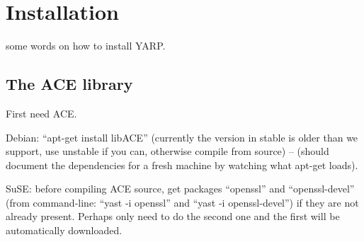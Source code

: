
\section{Installation}

some words on how to install YARP.

\subsection{The ACE library}

First need ACE.

Debian: ``apt-get install libACE'' (currently the version in stable is
older than we support, use unstable if you can, otherwise compile from
source) -- (should document the dependencies for a fresh machine by watching
what apt-get loads).


SuSE: before compiling ACE source, get packages ``openssl'' and
``openssl-devel'' (from command-line: ``yast -i openssl'' and ``yast
-i openssl-devel'') if they are not already present.  Perhaps only
need to do the second one and the first will be automatically
downloaded.

